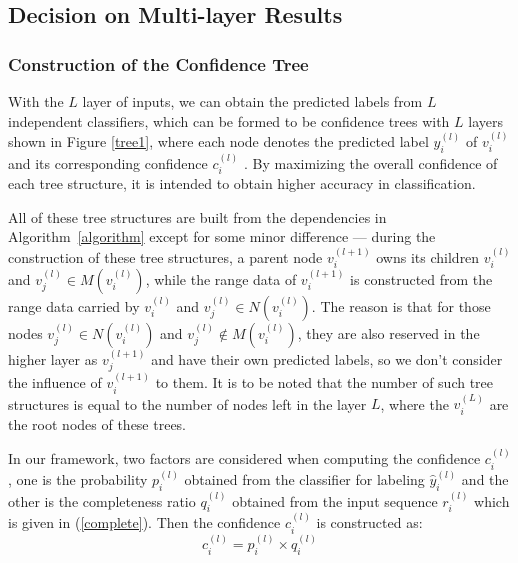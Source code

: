 \documentclass[letterpaper, 10 pt, conference]{ieeeconf}  %
\begin{document}
\subsection{Decision on Multi-layer Results}

\subsubsection{Construction of the Confidence Tree}

With the $L$ layer of inputs, we can obtain the predicted labels from $L$ independent classifiers, which can be formed to be confidence trees with $L$ layers shown in Figure \ref{tree1}, where each node denotes the predicted label $\hat{y}_i^{(l)}$ of $v_i^{(l)}$  and its corresponding confidence $c_i^{(l)}$ . By maximizing the overall confidence of each tree structure, it is intended to obtain higher accuracy in classification.

All of these tree structures are built from the dependencies in Algorithm~\ref{algorithm} except for some minor difference --- during the construction of these tree structures, a parent node $v_i^{(l+1)}$ owns its children $v_i^{(l)}$ and $v_j^{(l)}\in M(v_i^{(l)})$, while the range data of $v_i^{(l+1)}$ is constructed from the range data carried by $v_i^{(l)}$ and $v_j^{(l)}\in N(v_i^{(l)})$. The reason is that for those nodes $v_j^{(l)}\in N(v_i^{(l)})$ and $v_j^{(l)}\notin M(v_i^{(l)})$, they are also reserved in the higher layer as  $v_j^{(l+1)}$ and have their own predicted labels, so we don't consider the influence of $v_i^{(l+1)}$ to them. It is to be noted that the number of such tree structures is equal to the number of nodes left in the layer $L$, where the $v_i^{(L)}$ are the root nodes of these trees.


In our framework, two factors are considered when computing the confidence $c_i^{(l)}$, one is the probability $p_i^{(l)}$ obtained from the classifier for labeling $\hat{y}_i^{(l)}$ and the other is the completeness ratio $q_i^{(l)}$ obtained from the input sequence $r_i^{(l)}$ which is given in (\ref{complete}). Then the confidence $c_i^{(l)}$ is constructed as:
\begin{equation}\label{confidence}
c_i^{(l)} = p_i^{(l)} \times q_i^{(l)}
\end{equation}
\end{document}
